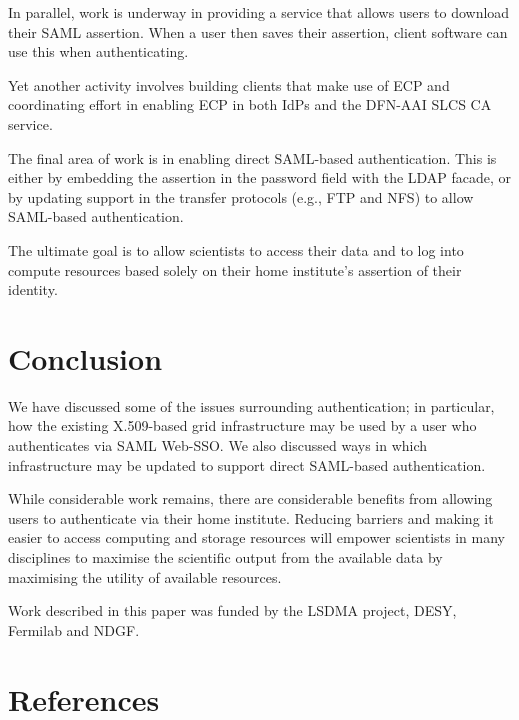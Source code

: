 \documentclass[a4paper]{jpconf}
\begin{document}
In parallel, work is underway in providing a service that allows users
to download their SAML assertion.  When a user then saves their
assertion, client software can use this when authenticating.

Yet another activity involves building clients that make use of ECP
and coordinating effort in enabling ECP in both IdPs and the DFN-AAI
SLCS CA service.

The final area of work is in enabling direct SAML-based
authentication.  This is either by embedding the assertion in the
password field with the LDAP facade, or by updating support in the
transfer protocols (e.g., FTP and NFS) to allow SAML-based
authentication.

The ultimate goal is to allow scientists to access their data and to
log into compute resources based solely on their home institute's
assertion of their identity.

\section{Conclusion}

We have discussed some of the issues surrounding authentication; in
particular, how the existing X.509-based grid infrastructure may be
used by a user who authenticates via SAML Web-SSO.  We also discussed
ways in which infrastructure may be updated to support direct
SAML-based authentication.

While considerable work remains, there are considerable benefits from
allowing users to authenticate via their home institute.  Reducing
barriers and making it easier to access computing and storage
resources will empower scientists in many disciplines to maximise the
scientific output from the available data by maximising the utility of
available resources.

\ack

Work described in this paper was funded by the LSDMA project, DESY,
Fermilab and NDGF.

\section*{References}

\end{document}
